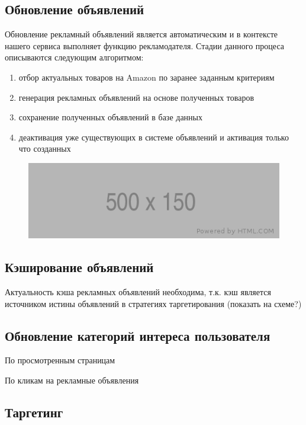 \documentclass[times]{itmo-student-thesis}
\begin{document}
\subsection{Обновление объявлений}

Обновление рекламный объявлений является автоматическим и в контексте нашего сервиса выполняет функцию рекламодателя. Стадии данного процеса описываются следующим алгоритмом:
\begin{enumerate}
\item отбор актуальных товаров на Amazon по заранее заданным критериям
\item генерация рекламных объявлений на основе полученных товаров
\item сохранение полученных объявлений в базе данных
\item деактивация уже существующих в системе объявлений и активация только что созданных
\end{enumerate}

\begin{figure}[h]
\includegraphics[width=\textwidth]{placeholder}
\centering
\end{figure}

\subsection{Кэширование объявлений}

Актуальность кэша рекламных объявлений необходима, т.к. кэш является источником истины объявлений в стратегиях таргетирования (показать на схеме?)

\subsection{Обновление категорий интереса пользователя}

По просмотренным страницам 

По кликам на рекламные объявления


\subsection{Таргетинг}
\end{document}
